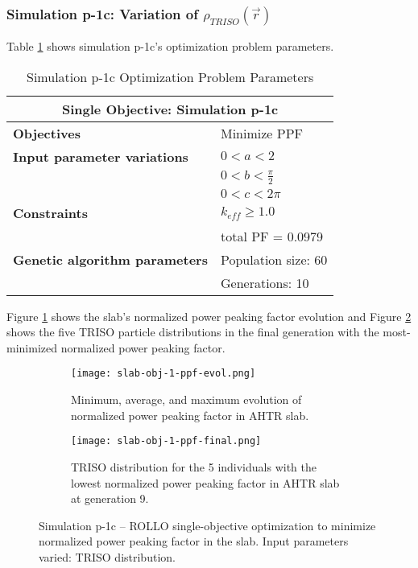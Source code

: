 \subsubsection{Simulation p-1c: Variation of $\rho_{TRISO}(\vec{r})$}
Table \ref{tab:simulationp1c} shows simulation p-1c's optimization problem parameters. 
\begin{table}[htbp]
    \centering
    \onehalfspacing
    \caption{Simulation p-1c Optimization Problem Parameters}
	\label{tab:simulationp1c}
    \footnotesize
    \begin{tabular}{l|p{3cm}}
    \hline 
    \multicolumn{2}{c}{\textbf{Single Objective: Simulation p-1c}} \\
    \hline 
    \textbf{Objectives} & Minimize PPF \\
    \hline 
    \textbf{Input parameter variations} & $0<a<2$ \\
    & $0<b<\frac{\pi}{2}$ \\
    & $0<c<2\pi$ \\
    \hline
    \textbf{Constraints} & $k_{eff} \geq 1.0$\\ 
    & total PF = 0.0979\\
    \hline 
    \textbf{Genetic algorithm parameters} & Population size: 60 \\
    & Generations: 10 \\
    \hline
    \end{tabular}
\end{table}
Figure \ref{fig:slab-obj-1-ppf-evol} shows the slab's normalized power peaking 
factor evolution and Figure \ref{fig:slab-obj-1-ppf-final} shows the five TRISO particle 
distributions in the final generation with the most-minimized normalized power peaking 
factor.
\begin{figure}[htbp]
    \centering
    \begin{subfigure}{\textwidth}
        \texttt{[image: slab-obj-1-ppf-evol.png]}
        \caption{Minimum, average, and maximum evolution of normalized power 
        peaking factor in AHTR slab.}
        \label{fig:slab-obj-1-ppf-evol} 
    \end{subfigure}
    \begin{subfigure}{\textwidth}
        \texttt{[image: slab-obj-1-ppf-final.png]}
        \caption{TRISO distribution for the 5 individuals with the 
        lowest normalized power peaking factor in AHTR slab at generation 9.}
        \label{fig:slab-obj-1-ppf-final} 
    \end{subfigure}
    \caption{Simulation p-1c -- ROLLO single-objective optimization to minimize normalized power 
    peaking factor in the slab. Input parameters varied: TRISO distribution.}
    \label{fig:slab-obj-1-ppf}
\end{figure}
